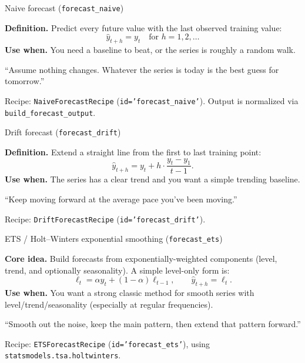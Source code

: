\documentclass[11pt]{article}
\begin{document}
\begin{ConceptBox}{Naive forecast (\texttt{forecast\_naive})}
\begin{ClassroomBox}
\textbf{Definition.} Predict every future value with the last observed training value:
\[
\hat{y}_{t+h} = y_t \quad \text{for } h=1,2,\dots
\]
\textbf{Use when.} You need a baseline to beat, or the series is roughly a random walk.
\end{ClassroomBox}
\begin{IntuitionBox}
“Assume nothing changes. Whatever the series is today is the best guess for tomorrow.”
\end{IntuitionBox}
\begin{WhereBox}
Recipe: \texttt{NaiveForecastRecipe} (\texttt{id='forecast\_naive'}). Output is normalized via \texttt{build\_forecast\_output}.
\end{WhereBox}
\end{ConceptBox}

\begin{ConceptBox}{Drift forecast (\texttt{forecast\_drift})}
\begin{ClassroomBox}
\textbf{Definition.} Extend a straight line from the first to last training point:
\[
\hat{y}_{t+h} = y_t + h\cdot\frac{y_t - y_1}{t-1}.
\]
\textbf{Use when.} The series has a clear trend and you want a simple trending baseline.
\end{ClassroomBox}
\begin{IntuitionBox}
“Keep moving forward at the average pace you’ve been moving.”
\end{IntuitionBox}
\begin{WhereBox}
Recipe: \texttt{DriftForecastRecipe} (\texttt{id='forecast\_drift'}).
\end{WhereBox}
\end{ConceptBox}

\begin{ConceptBox}{ETS / Holt–Winters exponential smoothing (\texttt{forecast\_ets})}
\begin{ClassroomBox}
\textbf{Core idea.} Build forecasts from exponentially-weighted components (level, trend, and optionally seasonality). A simple level-only form is:
\[
\ell_t=\alpha y_t+(1-\alpha)\ell_{t-1}, \qquad \hat{y}_{t+h}=\ell_t.
\]
\textbf{Use when.} You want a strong classic method for smooth series with level/trend/seasonality (especially at regular frequencies).
\end{ClassroomBox}
\begin{IntuitionBox}
“Smooth out the noise, keep the main pattern, then extend that pattern forward.”
\end{IntuitionBox}
\begin{WhereBox}
Recipe: \texttt{ETSForecastRecipe} (\texttt{id='forecast\_ets'}), using \texttt{statsmodels.tsa.holtwinters}.
\end{WhereBox}
\end{ConceptBox}
\end{document}
